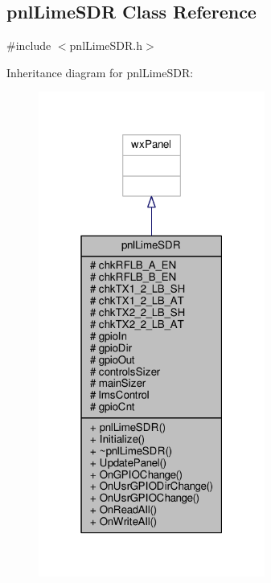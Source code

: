 \subsection{pnl\+Lime\+S\+DR Class Reference}
\label{classpnlLimeSDR}


{\ttfamily \#include $<$pnl\+Lime\+S\+D\+R.\+h$>$}



Inheritance diagram for pnl\+Lime\+S\+DR\+:
\nopagebreak
\begin{figure}[H]
\begin{center}
\leavevmode
\includegraphics[width=211pt]{dd/da1/classpnlLimeSDR__inherit__graph}
\end{center}
\end{figure}


